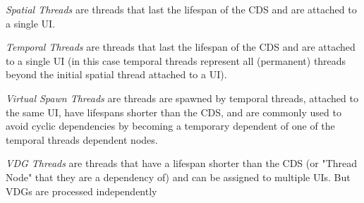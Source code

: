 \begin{con-def}
	\label{spatial-threads}
	\textit{Spatial Threads} are threads that last the lifespan of the CDS and are attached to a single UI.
\end{con-def}

\begin{con-def}
	\label{temporal-threads}
	\textit{Temporal Threads} are threads that last the lifespan of the CDS and are attached to a single UI (in this case temporal threads represent all (permanent) threads beyond the initial spatial thread attached to a UI).
\end{con-def}

\begin{con-def}
	\label{temporal-threads}
	\textit{Virtual Spawn Threads} are threads are spawned by temporal threads, attached to the same UI, have lifespans shorter than the CDS, and are commonly used to avoid cyclic dependencies by becoming a temporary dependent of one of the temporal threads dependent nodes.
\end{con-def}

\begin{con-def}
	\label{virtual-threads}
	\textit{VDG Threads} are threads that have a lifespan shorter than the CDS (or "Thread Node" that they are a dependency of) and can be assigned to multiple UIs. But VDGs are processed independently
\end{con-def}